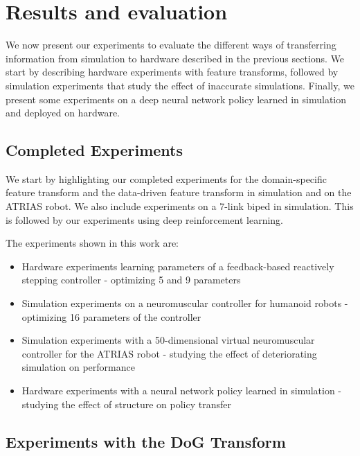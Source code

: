 \chapter{Results and evaluation}
We now present our experiments to evaluate the different ways of transferring information from simulation to hardware described in the previous sections. We start by describing hardware experiments with feature transforms, followed by simulation experiments that study the effect of inaccurate simulations. Finally, we present some experiments on a deep neural network policy learned in simulation and deployed on hardware.

\section{Completed Experiments}

We start by highlighting our completed experiments for the domain-specific feature transform and the data-driven feature transform in simulation and on the ATRIAS robot. We also include experiments on a 7-link biped in simulation. This is followed by our experiments using deep reinforcement learning.

The experiments shown in this work are:
\begin{itemize}
    \item Hardware experiments learning parameters of a feedback-based reactively stepping controller - optimizing 5 and 9 parameters 
    \item Simulation experiments on a neuromuscular controller for humanoid robots - optimizing 16 parameters of the controller
    \item Simulation experiments with a 50-dimensional virtual neuromuscular controller for the ATRIAS robot -  studying the effect of deteriorating simulation on performance
    \item Hardware experiments with a neural network policy learned in simulation - studying the effect of structure on policy transfer
\end{itemize}

\section{Experiments with the DoG Transform}


